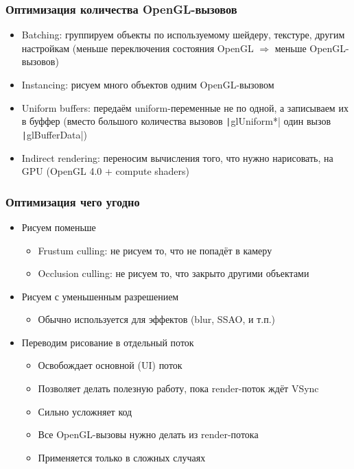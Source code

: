 \documentclass{beamer}
\begin{document}
\begin{frame}[fragile]
\frametitle{Оптимизация количества OpenGL-вызовов}
\begin{itemize}
\item Batching: группируем объекты по используемому шейдеру, текстуре, другим настройкам (меньше переключения состояния OpenGL \begin{math}\Longrightarrow\end{math} меньше OpenGL-вызовов)
\pause
\item Instancing: рисуем много объектов одним OpenGL-вызовом
\pause
\item Uniform buffers: передаём uniform-переменные не по одной, а записываем их в буффер (вместо большого количества вызовов \texttt|glUniform*| один вызов \texttt|glBufferData|)
\pause
\item Indirect rendering: переносим вычисления того, что нужно нарисовать, на GPU (OpenGL 4.0 + compute shaders)
\end{itemize}
\end{frame}

\begin{frame}[fragile]
\frametitle{Оптимизация чего угодно}
\begin{itemize}
\item Рисуем поменьше
\pause
\begin{itemize}
\item Frustum culling: не рисуем то, что не попадёт в камеру
\pause
\item Occlusion culling: не рисуем то, что закрыто другими объектами
\end{itemize}
\pause
\item Рисуем с уменьшенным разрешением
\pause
\begin{itemize}
\item Обычно используется для эффектов (blur, SSAO, и т.п.)
\end{itemize}
\pause
\item Переводим рисование в отдельный поток
\pause
\begin{itemize}
\item Освобождает основной (UI) поток
\pause
\item Позволяет делать полезную работу, пока render-поток ждёт VSync
\pause
\item Сильно усложняет код
\pause
\item Все OpenGL-вызовы нужно делать из render-потока
\pause
\item Применяется только в сложных случаях
\end{itemize}
\end{itemize}
\end{frame}
\end{document}
